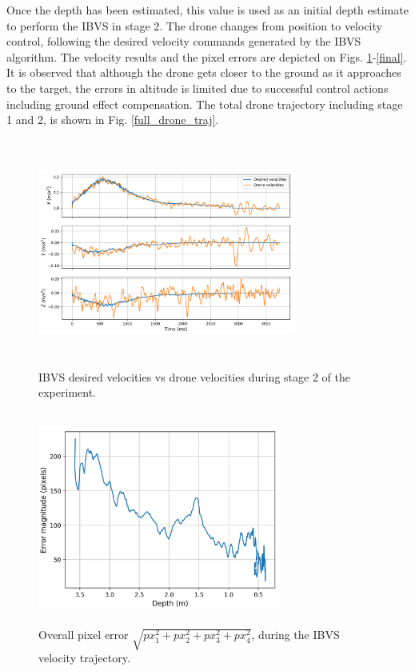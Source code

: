 \documentclass[conference]{IEEEtran}
\begin{document}
Once the depth has been estimated, this value is used as an initial depth estimate to perform the IBVS in stage 2. The drone changes from position to velocity control, following the desired velocity commands generated by the IBVS algorithm. The velocity results and the pixel errors are depicted on Figs. \ref{ibvs_vels}-\ref{final}. It is observed that although the drone gets closer to the ground as it approaches to the target, the errors in altitude is limited due to successful control actions including ground effect compensation. The total drone trajectory including stage 1 and 2, is shown in Fig. \ref{full_drone_traj}. 

\begin{figure}
\centering
\includegraphics[width=8.5cm, height=7.5cm]{Images/velocities_stage2.png}
\caption{IBVS desired velocities vs drone velocities during stage 2 of the experiment.}
\label{ibvs_vels}
\end{figure}

\begin{figure}
\centering
\includegraphics[width=8cm, height=7cm]{Images/pixel_error_mag.png}
\caption{Overall pixel error $\sqrt{px_{1}^{2}+px_{2}^{2}+px_{3}^{2}+px_{4}^{2}}$, during the IBVS velocity trajectory.}
\label{pixel_error}
\end{figure}
\end{document}
